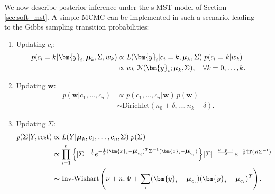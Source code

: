 We now describe posterior inference under the s-MST model of Section \ref{sec:soft_mst}. A simple MCMC can be implemented in such a scenario, leading to the Gibbs sampling transition probabilities:
\begin{enumerate}
\item Updating $c_i$:
\begin{align*}
p (c_i = k | \bm{y}_i, \bfmu_k, \Sigma, w_k) &\propto L(\bm{y}_i | c_i = k, \bfmu_k, \Sigma) \ p(c_i = k | w_k)
\\
&\propto w_k \ \mathcal{N} (\bm{y}_i; \bfmu_{k}, \Sigma), \quad \forall k = 0, \dots, k.
\end{align*}

\item Updating $\bm{w}$:
\begin{align*}
p(\bm{w} | c_1, \dots, c_n) &\propto p(c_1, \dots, c_n | \bm{w}) \ p(\bm{w})
\\
&\sim \mbox{Dirichlet} (n_0 + \delta, \dots, n_k + \delta).
\end{align*}


\item Updating $\Sigma$:
\begin{align*}
p (\Sigma | Y ,  \mbox{rest}) &\propto L(Y |  \bfmu_k, c_1, \dots, c_n, \Sigma) \ p(\Sigma)
\\
&\propto \prod_{i=1}^n \left\{ |\Sigma|^{-\frac{1}{2}} e^{-\frac{1}{2} (\bm{x}_i - \bfmu_{c_i})^T \Sigma^{-1} (\bm{x}_i - \bfmu_{c_i})} \right\} |\Sigma|^{- \frac{\nu + p + 1}{2}} e^{ - \frac{1}{2} \mbox{tr} (R \Sigma^{-1})}
\\
&\sim \text{Inv-Wishart} \left( \nu + n, \Psi + \sum_{i} (\bm{y}_i - \bfmu_{c_i})(\bm{y}_i - \bfmu_{c_i})^T \right).
\end{align*}



\end{enumerate}
